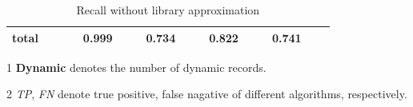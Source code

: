 \documentclass{fac}
\begin{document}
\begin{table}
\begin{threeparttable}[b]
\begin{tabular*}{0.98\textwidth}{|l|c|c|c|c|c|c|c|c|c|c|c|c|c|c|c|}
\textbf{total} & & & & \textbf{0.999} & & & \textbf{0.734} & & & \textbf{0.822} & & & \textbf{0.741} \\
	\hline
\end{tabular*}
\begin{tablenotes}
  \item[1] \textbf{Dynamic} denotes the number of dynamic records.
  \item[2] \textit{TP}, \textit{FN} denote true positive, false nagative of different algorithms, respectively.
\end{tablenotes}
\caption{Recall without library approximation}\label{table:nolib-recall}
\end{threeparttable}
\end{table}


\end{document}
